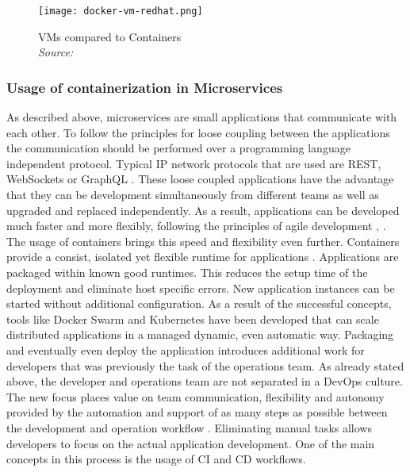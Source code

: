 \documentclass[12pt, a4paper]{article}
\begin{document}
        \begin{figure}
            \centering
            \texttt{[image: docker-vm-redhat.png]}
            \caption{\ac{VM}s compared to Containers \\\textit{Source:~\cite{redhat_pic}}}\label{fig::vm_docker}
        \end{figure}

        \subsubsection{Usage of containerization in Microservices}
        As described above, microservices are small applications that communicate with each other. To follow the principles for loose coupling between the applications the communication should be performed over a programming language independent protocol. Typical \acs{IP} network protocols that are used are \ac{REST}, WebSockets or GraphQL \cite{micro}. These loose coupled applications have the advantage that they can be development simultaneously from different teams as well as upgraded and replaced independently. As a result, applications can be developed much faster and more flexibly, following the principles of agile development \cite{micro}, \cite{redhat_micro}.\newline
        The usage of containers brings this speed and flexibility even further. Containers provide a consist, isolated yet flexible runtime for applications \cite{micro_container}. Applications are packaged within known good runtimes. This reduces the setup time of the deployment and eliminate host specific errors. New application instances can be started without additional configuration. As a result of the successful concepts, tools like Docker Swarm and Kubernetes have been developed that can scale distributed applications in a managed dynamic, even automatic way.\newline
        \noindent Packaging and eventually even deploy the application introduces additional work for developers that was previously the task of the operations team. As already stated above, the developer and operations team are not separated in a DevOps culture. The new focus places value on team communication, flexibility and autonomy provided by the automation and support of as many steps as possible between the development and operation workflow \cite{effective_devops}. Eliminating manual tasks allows developers to focus on the actual application development. One of the main concepts in this process is the usage of \ac{CI} and \ac{CD} workflows.
\end{document}
